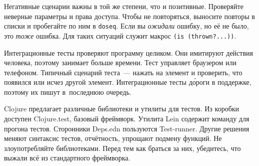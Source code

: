 Негативные сценарии важны в той же степени, что и позитивные. Проверяйте
неверные параметры и права доступа. Чтобы не повторяться, выносите повторы в
списки и пробегайте по ним в \verb|doseq|. Если вы \emph{ожидали} ошибку, но
её не было, это \emph{тоже} ошибка. Для таких ситуаций служит
макрос \verb|(is (thrown?...))|.

Интеграционные тесты проверяют программу целиком. Они имитируют действия
человека, поэтому занимает больше времени. Тест управляет браузером или
телефоном. Типичный сценарий теста~--- нажать на элемент и проверить, что
появился или исчез другой элемент. Интеграционные тесты д\'{о}роги в поддержке,
поэтому их пишут в~последнюю очередь.

Clojure предлагает различные библиотеки и утилиты для тестов. Из коробки
доступен Clojure.test, базовый фреймворк. Утилита Lein содержит команду для
прогона тестов. Сторонники Deps.edn пользуются Test-runner. Другие решения
меняют синтаксис тестов, отчётность, упрощают подмену функций. Не
злоупотребляйте библиотеками. Перед тем как браться за них, убедитесь, что
выжали всё из стандартного фреймворка.

